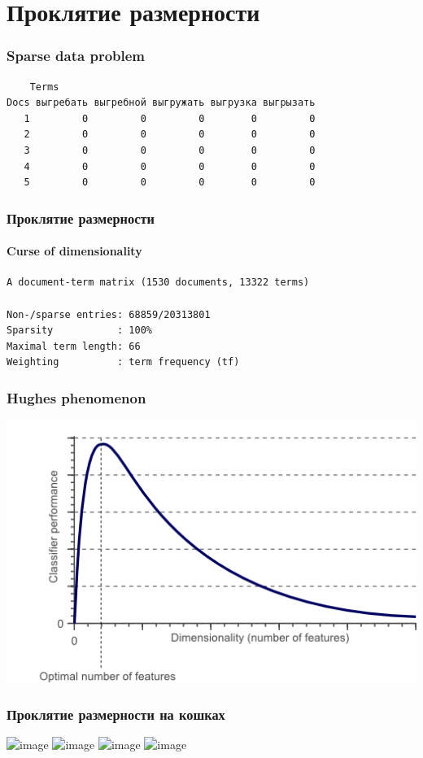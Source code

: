 \documentclass[svgnames]{beamer}
\begin{document}
\section{Проклятие размерности}

\begin{frame}[fragile]
  \frametitle{Sparse data problem}
\begin{verbatim}
    Terms
Docs выгребать выгребной выгружать выгрузка выгрызать
   1         0         0         0        0         0
   2         0         0         0        0         0
   3         0         0         0        0         0
   4         0         0         0        0         0
   5         0         0         0        0         0
\end{verbatim}
\end{frame}

\begin{frame}[fragile]
  \frametitle{Проклятие размерности}
  \framesubtitle{Curse of dimensionality}
\begin{verbatim}
A document-term matrix (1530 documents, 13322 terms)

Non-/sparse entries: 68859/20313801
Sparsity           : 100%
Maximal term length: 66 
Weighting          : term frequency (tf)
\end{verbatim}
\end{frame}

\begin{frame}
  \frametitle{Hughes phenomenon}
  \centering
  \includegraphics[width=.9\textwidth]{dimensionality_vs_performance}
\end{frame}

\begin{frame}
  \frametitle{Проклятие размерности на кошках}
  \centering
  \includegraphics<1>[width=.6\textwidth]{1Dproblem}
  \includegraphics<2>[width=.6\textwidth]{2Dproblem}
  \includegraphics<3>[width=.6\textwidth]{3Dproblem}
  \includegraphics<4>[width=.6\textwidth]{3Dproblem_separated}
\end{frame}
\end{document}
